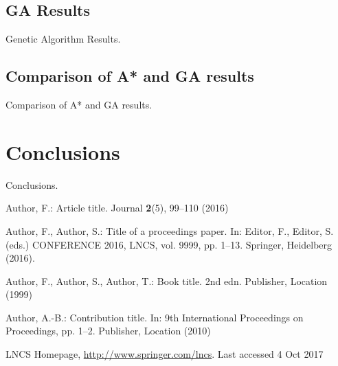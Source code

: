 \documentclass[11pt]{llncs}
\begin{document}
\subsection{GA Results}\label{gen_results}
Genetic Algorithm Results.
\subsection{Comparison of A* and GA results}\label{comparison_astar_gen}
Comparison of A* and GA results.
\section{Conclusions}\label{conclusions}
Conclusions.
\begin{thebibliography}{8}
Author, F.: Article title. Journal \textbf{2}(5), 99--110 (2016)

Author, F., Author, S.: Title of a proceedings paper. In: Editor,
F., Editor, S. (eds.) CONFERENCE 2016, LNCS, vol. 9999, pp. 1--13.
Springer, Heidelberg (2016). 

Author, F., Author, S., Author, T.: Book title. 2nd edn. Publisher,
Location (1999)

Author, A.-B.: Contribution title. In: 9th International Proceedings
on Proceedings, pp. 1--2. Publisher, Location (2010)

LNCS Homepage, \url{http://www.springer.com/lncs}. Last accessed 4
Oct 2017
\end{thebibliography}
\end{document}
